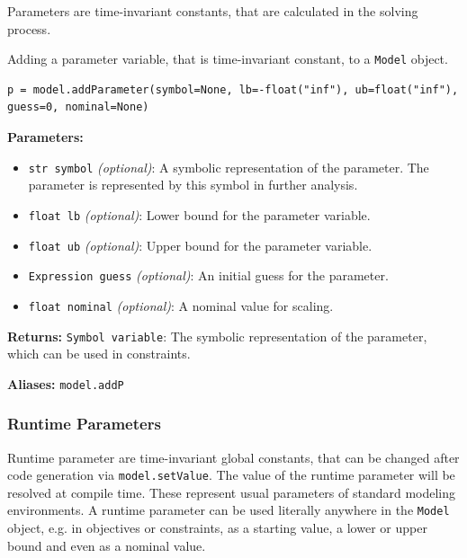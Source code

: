 \documentclass[12pt]{article}
\begin{document}
Parameters are time-invariant constants, that are calculated in the
solving process.

\begin{mdframed}[backgroundcolor=gray!10, roundcorner=10pt,
		linewidth=1pt]

	Adding a parameter variable, that is time-invariant constant,
	to a \texttt{Model} object.

	\begin{lstlisting}
p = model.addParameter(symbol=None, lb=-float("inf"), ub=float("inf"), guess=0, nominal=None)
		\end{lstlisting}
	\label{addParameter}
	\textbf{Parameters:}
	\begin{itemize}
		\item \texttt{str symbol} \emph{(optional)}: A symbolic
		      representation of the parameter. The parameter is
		      represented by this
		      symbol in further analysis.
		\item \texttt{float lb} \emph{(optional)}: Lower bound
		      for the parameter variable.
		\item \texttt{float ub} \emph{(optional)}: Upper bound
		      for the parameter variable.
		\item \texttt{Expression guess} \emph{(optional)}: An
		      initial guess for the parameter.
		\item \texttt{float nominal} \emph{(optional)}: A
		      nominal value for scaling.
	\end{itemize}

	\textbf{Returns:}
	\texttt{Symbol variable}: The symbolic representation of the
	parameter, which can be used in constraints.

	\textbf{Aliases:} \texttt{model.addP}
\end{mdframed}

\subsubsection{Runtime Parameters}
\label{c:runtimeParameters}
Runtime parameter are time-invariant global constants, that can be
changed after code generation via \texttt{model.setValue}. The value of the
runtime parameter will be resolved at compile time. These represent usual
parameters of standard modeling environments. A runtime parameter can be used
literally anywhere in the \texttt{Model} object, e.g. in objectives or
constraints, as a starting value, a lower or upper bound and even as a nominal
value.
\end{document}
